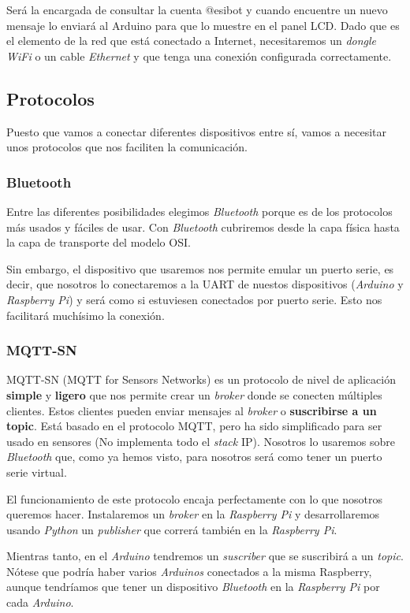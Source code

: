 Será la encargada de consultar la cuenta @esibot y cuando encuentre un nuevo
mensaje lo enviará al Arduino para que lo muestre en el panel LCD. Dado
que es el elemento de la red que está conectado a Internet, necesitaremos un
\emph{dongle} \emph{WiFi} o un cable \emph{Ethernet} y que tenga una conexión
configurada correctamente.

\subsection{Protocolos}\label{protocolos}

Puesto que vamos a conectar diferentes dispositivos entre sí, vamos a
necesitar unos protocolos que nos faciliten la comunicación.

\subsubsection{Bluetooth}\label{bluetooth}

Entre las diferentes posibilidades elegimos \emph{Bluetooth} porque es
de los protocolos más usados y fáciles de usar. Con \emph{Bluetooth}
cubriremos desde la capa física hasta la capa de transporte del modelo
OSI.

Sin embargo, el dispositivo que usaremos nos permite emular un puerto
serie, es decir, que nosotros lo conectaremos a la UART de nuestos
dispositivos (\emph{Arduino} y \emph{Raspberry Pi}) y será como si
estuviesen conectados por puerto serie. Esto nos facilitará muchísimo la
conexión.

\subsubsection{MQTT-SN}\label{mqtt-sn}

MQTT-SN (MQTT for Sensors Networks) es un protocolo de nivel de aplicación \textbf{simple}
y \textbf{ligero} que nos permite crear un \emph{broker} donde se
conecten múltiples clientes. Estos clientes pueden enviar mensajes al
\emph{broker} o \textbf{suscribirse a un topic}. Está basado en el
protocolo MQTT, pero ha sido simplificado para ser usado en sensores (No
implementa todo el \emph{stack} IP). Nosotros lo usaremos sobre
\emph{Bluetooth} que, como ya hemos visto, para nosotros será como tener
un puerto serie virtual.

El funcionamiento de este protocolo encaja perfectamente con lo que
nosotros queremos hacer. Instalaremos un \emph{broker} en la
\emph{Raspberry Pi} y desarrollaremos usando \emph{Python} un
\emph{publisher} que correrá también en la \emph{Raspberry Pi}.

Mientras tanto, en el \emph{Arduino} tendremos un \emph{suscriber} que
se suscribirá a un \emph{topic}. Nótese que podría haber varios
\emph{Arduinos} conectados a la misma Raspberry, aunque tendríamos que
tener un dispositivo \emph{Bluetooth} en la \emph{Raspberry Pi} por cada
\emph{Arduino}.